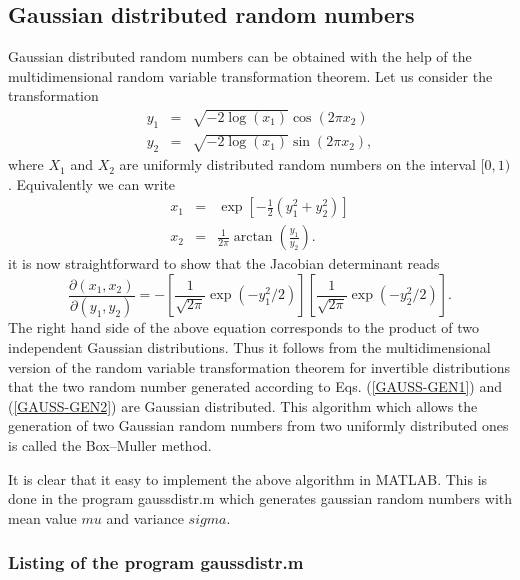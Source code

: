 \subsection{Gaussian distributed random numbers}
Gaussian distributed random numbers can be obtained with the help 
of the multidimensional random variable transformation theorem.
Let us consider the transformation
\begin{eqnarray}
\label{GAUSS-GEN1}
y_1 & = & \sqrt{-2\log(x_1)} \cos(2 \pi x_2) \\
\label{GAUSS_GEN2}
y_2 & = & \sqrt{-2\log(x_1)} \sin(2 \pi x_2),
\end{eqnarray}
where $X_1$ and $X_2$ are uniformly distributed random numbers on 
the interval $[0,1)$. Equivalently we can write
\begin{eqnarray*}
x_1 & = & \exp[-\frac{1}{2}(y_1^2+y_2^2)] \\
x_2 & = & \frac{1}{2 \pi} \arctan\left( \frac{y_1}{y_2}\right).
\end{eqnarray*}
it is now straightforward  to show that the Jacobian determinant
reads
\begin{equation*}
\frac{\partial(x_1,x_2)}{\partial(y_1,y_2)} = 
   - \left[ \frac{1}{\sqrt{2 \pi}} \exp(-y_1^2/2)\right]
   \left[ \frac{1}{\sqrt{2 \pi}} \exp(-y_2^2/2)\right].
\end{equation*}
The right hand side of the above equation corresponds to the 
product of two independent Gaussian distributions. Thus it follows
from the multidimensional version of the random variable 
transformation  theorem for invertible distributions that the
two random number generated according to Eqs. (\ref{GAUSS-GEN1}) 
and (\ref{GAUSS-GEN2}) are Gaussian distributed. This algorithm 
which allows the generation of two Gaussian random numbers from 
two uniformly distributed ones is called the Box--Muller method.

It is clear that it easy to implement the above algorithm in 
MATLAB. This is done in the program {\sf gaussdistr.m} which generates
gaussian random numbers with mean value $mu$ and variance $sigma$.

\subsubsection{Listing of the program gaussdistr.m}

